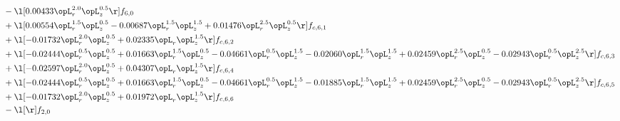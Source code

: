 \begin{alignat}{2}
& - \l[  0.00433 \opL_r^{2.0} \opL_z^{0.5}  \r] f_{6,0} \nonumber \\ 
& + \l[  0.00554 \opL_r^{1.5} \opL_z^{0.5}   -0.00687 \opL_r^{1.5} \opL_z^{1.5} +  0.01476 \opL_r^{2.5} \opL_z^{0.5}  \r] f_{c,6,1} \nonumber \\ 
& + \l[  -0.01732 \opL_r^{2.0} \opL_z^{0.5} +  0.02335 \opL_r \opL_z^{1.5}  \r] f_{c,6,2} \nonumber \\ 
& + \l[  -0.02444 \opL_r^{0.5} \opL_z^{0.5} +  0.01663 \opL_r^{1.5} \opL_z^{0.5}   -0.04661 \opL_r^{0.5} \opL_z^{1.5}   -0.02060 \opL_r^{1.5} \opL_z^{1.5} +  0.02459 \opL_r^{2.5} \opL_z^{0.5}   -0.02943 \opL_r^{0.5} \opL_z^{2.5}  \r] f_{c,6,3} \nonumber \\ 
& + \l[  -0.02597 \opL_r^{2.0} \opL_z^{0.5} +  0.04307 \opL_r \opL_z^{1.5}  \r] f_{c,6,4} \nonumber \\ 
& + \l[  -0.02444 \opL_r^{0.5} \opL_z^{0.5} +  0.01663 \opL_r^{1.5} \opL_z^{0.5}   -0.04661 \opL_r^{0.5} \opL_z^{1.5}   -0.01885 \opL_r^{1.5} \opL_z^{1.5} +  0.02459 \opL_r^{2.5} \opL_z^{0.5}   -0.02943 \opL_r^{0.5} \opL_z^{2.5}  \r] f_{c,6,5} \nonumber \\ 
& + \l[  -0.01732 \opL_r^{2.0} \opL_z^{0.5} +  0.01972 \opL_r \opL_z^{1.5}  \r] f_{c,6,6} \nonumber \\ 
& - \l[  \r] f_{2,0} \nonumber \\ 
\end{alignat} 



